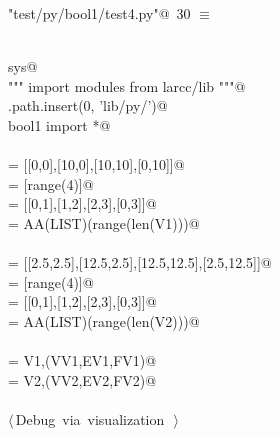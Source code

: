\documentclass[11pt,oneside]{article}	%
\begin{document}
\begin{flushleft} \small \label{scrap38}
\protect{}\verb@"test/py/bool1/test4.py"@\nobreak\ {\footnotesize 30 }$\equiv$
\vspace{-1ex}
\begin{list}{}{} \item
\mbox{}\verb@@\\
\mbox{}\verb@import sys@\\
\mbox{}\verb@""" import modules from larcc/lib """@\\
\mbox{}\verb@sys.path.insert(0, 'lib/py/')@\\
\mbox{}\verb@from bool1 import *@\\
\mbox{}\verb@@\\
\mbox{} = [[0,0],[10,0],[10,10],[0,10]]@\\
\mbox{} = [range(4)]@\\
\mbox{} = [[0,1],[1,2],[2,3],[0,3]]@\\
\mbox{} = AA(LIST)(range(len(V1)))@\\
\mbox{}\verb@@\\
\mbox{} = [[2.5,2.5],[12.5,2.5],[12.5,12.5],[2.5,12.5]]@\\
\mbox{} = [range(4)]@\\
\mbox{} = [[0,1],[1,2],[2,3],[0,3]]@\\
\mbox{} = AA(LIST)(range(len(V2)))@\\
\mbox{}\verb@@\\
\mbox{} = V1,(VV1,EV1,FV1)@\\
\mbox{} = V2,(VV2,EV2,FV2)@\\
\mbox{}\verb@@\\
\mbox{}\verb@@\hbox{$\langle\,$Debug via visualization\nobreak\ {\footnotesize {}}$\,\rangle$}\verb@@\\
\mbox{}\verb@@{\NWsep}
\end{list}
\vspace{-2ex}
\end{flushleft}

\end{document}
